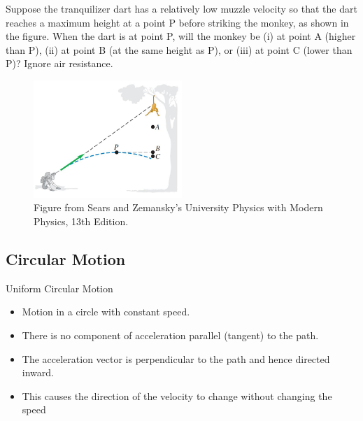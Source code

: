 \documentclass[]{beamer}
\begin{document}
\begin{frame}

    Suppose the tranquilizer dart
    has a relatively low muzzle velocity so that
    the dart reaches a maximum height at a
    point P before striking the monkey,
    as shown in the figure. When the
    dart is at point P, will the monkey
    be (i) at point A (higher than P),
    (ii) at point B (at the same height
    as P), or (iii) at point C (lower
    than P)? Ignore air resistance.

    \vspace{3mm}
    
    \begin{figure}[h!]  
        \includegraphics[width=0.5\textwidth]{images/26.jpg}
         \caption{ {\tiny Figure from Sears and Zemansky's University Physics 
         with Modern Physics, 13th Edition.} }
      \end{figure}


    
      \end{frame}
      




\subsection{ Circular Motion}

\begin{frame}

   Uniform Circular Motion
   \vspace{3mm}
   
   \begin{itemize}
   \item Motion in a circle with constant speed.
    \item There is no component of acceleration parallel (tangent) to
the path.
\item The acceleration vector is perpendicular to the path and hence directed inward.
\item This causes the direction of the velocity to change
without changing the speed
   \end{itemize}

    
      \end{frame}
      
\end{document}
